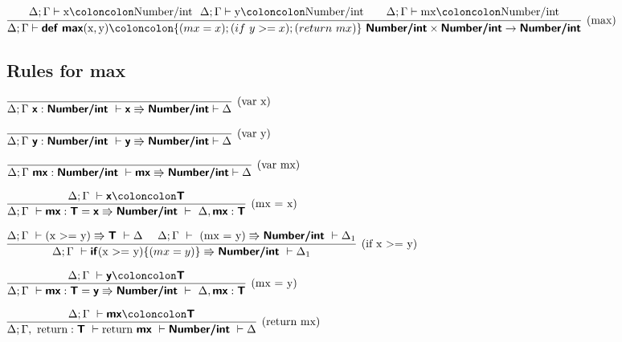 \documentclass[a4paper]{article}
\newcommand{\kw}[1]{\textsf{\textbf{#1}}}
\newcommand{\colcol}{\coloncolon}
\newcommand{\yield}{\Rrightarrow}
\begin{document}
\vspace{3\baselineskip}

$\infer[\text{(max)}]%
{\Delta;\Gamma \vdash \kw{def}~\kw{max}(\textrm{x},\textrm{y}) \colcol \{(mx = x);(if~y>=x); (return~mx)\} ~ \kw{Number/int}\times\kw{Number/int}\rightarrow\kw{Number/int}}%
{\Delta;\Gamma \vdash \textrm{x} \colcol \textrm{Number/int}~~ \Delta;\Gamma \vdash\textrm{y} \colcol \textrm{Number/int}&&
\Delta;\Gamma \vdash\textrm{mx} \colcol \textrm{Number/int}}$

\vspace{3\baselineskip}

\subsection{Rules for max}

\vspace{2\baselineskip}

$\infer[\text{(var x)}]%
{\Delta;\Gamma~ \kw{x}:\kw{Number/int}~ \vdash \kw{x} \yield \kw{Number/int} \vdash\Delta}%
{}$

\vspace{2\baselineskip}

$\infer[\text{(var y)}]%
{\Delta;\Gamma~ \kw{y}:\kw{Number/int}~ \vdash \kw{y} \yield \kw{Number/int} \vdash\Delta}%
{}$

\vspace{2\baselineskip}

$\infer[\text{(var mx)}]%
{\Delta;\Gamma~ \kw{mx}:\kw{Number/int}~ \vdash \kw{mx} \yield \kw{Number/int} \vdash\Delta}%
{}$

\vspace{2\baselineskip}

$\infer[\text{(mx = x)}]%
{\Delta;\Gamma~\vdash \kw{mx} : \kw{T} = \kw{x} \yield \kw{Number/int}~ \vdash~\Delta,\kw{mx}:\kw{T} }%
{\Delta; \Gamma~\vdash \kw{x}\colcol\kw{T}}$

\vspace{2\baselineskip}

$\infer[\text{(if x \textgreater= y)}]%
{\Delta;\Gamma~\vdash \kw{if} \text{(x \textgreater= y)} \{(mx = y)\} \yield \kw{Number/int}~ \vdash\Delta_\textrm{1}}%
{\Delta; \Gamma~\vdash \text{(x \textgreater= y)} \yield \kw{T}~\vdash\Delta ~~~~ \Delta; \Gamma~\vdash~\text{(mx = y)}\yield \kw{Number/int}~\vdash\Delta_\textrm{1}}$

\vspace{2\baselineskip}

$\infer[\text{(mx = y)}]%
{\Delta;\Gamma~\vdash \kw{mx} : \kw{T} = \kw{y} \yield \kw{Number/int}~ \vdash~\Delta,\kw{mx}:\kw{T} }%
{\Delta; \Gamma~\vdash \kw{y}\colcol\kw{T}}$

\vspace{2\baselineskip}

$\infer[\text{(return mx)}]%
{\Delta;\Gamma, ~\text{return}:\kw{T}~\vdash\text{return}~\kw{mx}~\vdash \kw{Number/int}~ \vdash \Delta}%
{\Delta; \Gamma~\vdash \kw{mx}\colcol\kw{T}}$
\end{document}
